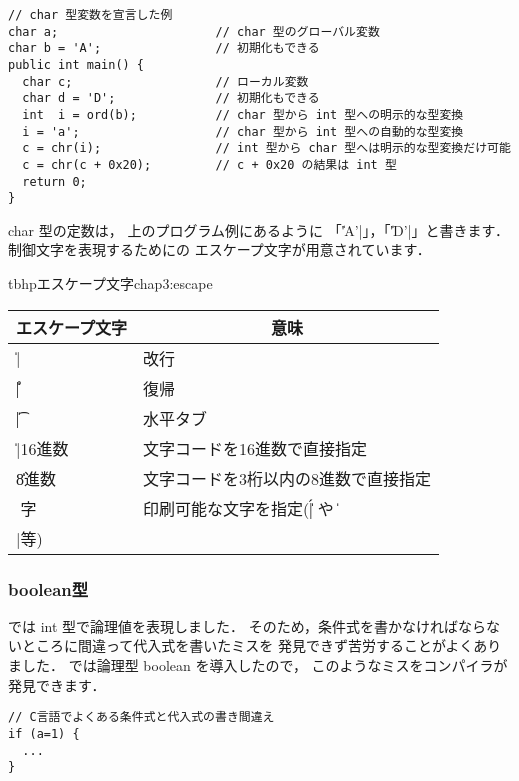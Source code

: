 \begin{mylist}
\begin{verbatim}
// char 型変数を宣言した例
char a;                      // char 型のグローバル変数
char b = 'A';                // 初期化もできる
public int main() {
  char c;                    // ローカル変数
  char d = 'D';              // 初期化もできる
  int  i = ord(b);           // char 型から int 型への明示的な型変換
  i = 'a';                   // char 型から int 型への自動的な型変換
  c = chr(i);                // int 型から char 型へは明示的な型変換だけ可能
  c = chr(c + 0x20);         // c + 0x20 の結果は int 型
  return 0;
}
\end{verbatim}
\end{mylist}

char 型の定数は，
上のプログラム例にあるように 「\|'A'|」，「\|'D'|」と書きます．
制御文字を表現するためにの
エスケープ文字が用意されています．

\begin{mytable}{tbhp}{エスケープ文字}{chap3:escape}
\begin{tabular}{ll}
\hline
\multicolumn{1}{c}{エスケープ文字} & \multicolumn{1}{c}{意味} \\
\hline
\|\n| & 改行 \\
\|\r| & 復帰 \\
\|\t| & 水平タブ \\
\|\x|16進数 & 文字コードを16進数で直接指定 \\
\|\|8進数 & 文字コードを3桁以内の8進数で直接指定 \\
\|\|文字 & 印刷可能な文字を指定(\|\'| や \|\\|等) \\
\hline
\end{tabular}
\end{mytable}

\subsubsection{boolean型}

\cl では int 型で論理値を表現しました．
そのため，条件式を書かなければならないところに間違って代入式を書いたミスを
発見できず苦労することがよくありました．
\cmml では論理型 boolean を導入したので，
このようなミスをコンパイラが発見できます．

\begin{mylist}
\begin{verbatim}
// C言語でよくある条件式と代入式の書き間違え
if (a=1) {
  ...
}
\end{verbatim}
\end{mylist}

